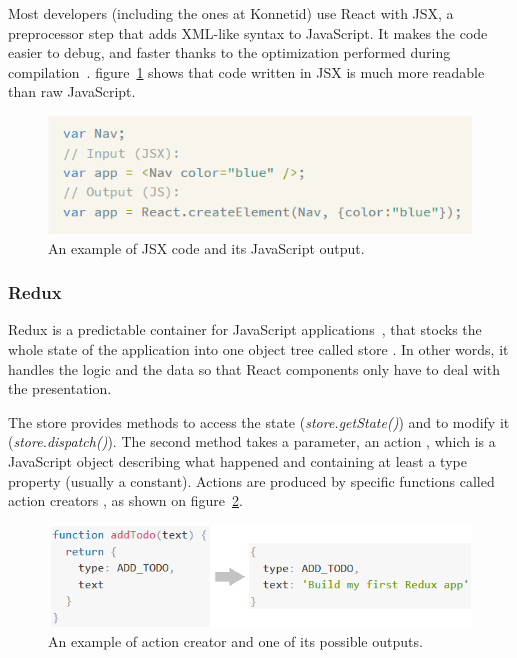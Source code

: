 Most developers (including the ones at Konnetid) use React with JSX, a preprocessor step that adds XML-like syntax to JavaScript.
It makes the code easier to debug, and faster thanks to the optimization performed during compilation~\cite{whyJsx}. {\sc figure}~\ref{fig:jsx} shows that code written in JSX is much more readable than raw JavaScript.

\begin{figure}[H]
    \centering
    \includegraphics[scale=0.9]{figure/jsx.png}
    \caption{An example of JSX code and its JavaScript output.}
    \label{fig:jsx}
\end{figure}

\subsubsection{Redux}
\label{sssec:redux}

Redux is a predictable container for JavaScript applications~\cite{reduxDoc}, that stocks the whole state of the application into one object tree called \guillemotleft{} store \guillemotright{}. In other words, it handles the logic and the data so that React components only have to deal with the presentation.

The store provides methods to access the state (\textit{store.getState()}) and to modify it (\textit{store.dispatch()}). The second method takes a parameter, an \guillemotleft{} action \guillemotright{}, which is a JavaScript object describing what happened and containing at least a type property (usually a constant). Actions are produced by specific functions called \guillemotleft{} action creators \guillemotright{}, as shown on {\sc figure}~\ref{fig:action}.

\begin{figure}[H]
    \centering
    \includegraphics[scale=0.9]{figure/action.png}
    \caption{An example of action creator and one of its possible outputs.}
    \label{fig:action}
\end{figure}

